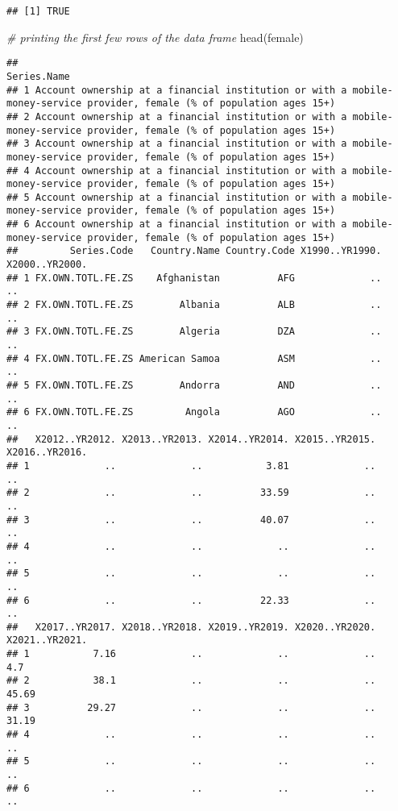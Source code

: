 \documentclass[
]{article}
\newenvironment{Shaded}{\begin{snugshade}}{\end{snugshade}}
\newcommand{\CommentTok}[1]{\textcolor[rgb]{0.56,0.35,0.01}{\textit{#1}}}
\newcommand{\FunctionTok}[1]{\textcolor[rgb]{0.00,0.00,0.00}{#1}}
\newcommand{\NormalTok}[1]{#1}
\begin{document}
\begin{verbatim}
## [1] TRUE
\end{verbatim}

\begin{Shaded}
\begin{Highlighting}[]
\CommentTok{\# printing the first few rows of the data frame}
\FunctionTok{head}\NormalTok{(female)}
\end{Highlighting}
\end{Shaded}

\begin{verbatim}
##                                                                                                               Series.Name
## 1 Account ownership at a financial institution or with a mobile-money-service provider, female (% of population ages 15+)
## 2 Account ownership at a financial institution or with a mobile-money-service provider, female (% of population ages 15+)
## 3 Account ownership at a financial institution or with a mobile-money-service provider, female (% of population ages 15+)
## 4 Account ownership at a financial institution or with a mobile-money-service provider, female (% of population ages 15+)
## 5 Account ownership at a financial institution or with a mobile-money-service provider, female (% of population ages 15+)
## 6 Account ownership at a financial institution or with a mobile-money-service provider, female (% of population ages 15+)
##         Series.Code   Country.Name Country.Code X1990..YR1990. X2000..YR2000.
## 1 FX.OWN.TOTL.FE.ZS    Afghanistan          AFG             ..             ..
## 2 FX.OWN.TOTL.FE.ZS        Albania          ALB             ..             ..
## 3 FX.OWN.TOTL.FE.ZS        Algeria          DZA             ..             ..
## 4 FX.OWN.TOTL.FE.ZS American Samoa          ASM             ..             ..
## 5 FX.OWN.TOTL.FE.ZS        Andorra          AND             ..             ..
## 6 FX.OWN.TOTL.FE.ZS         Angola          AGO             ..             ..
##   X2012..YR2012. X2013..YR2013. X2014..YR2014. X2015..YR2015. X2016..YR2016.
## 1             ..             ..           3.81             ..             ..
## 2             ..             ..          33.59             ..             ..
## 3             ..             ..          40.07             ..             ..
## 4             ..             ..             ..             ..             ..
## 5             ..             ..             ..             ..             ..
## 6             ..             ..          22.33             ..             ..
##   X2017..YR2017. X2018..YR2018. X2019..YR2019. X2020..YR2020. X2021..YR2021.
## 1           7.16             ..             ..             ..            4.7
## 2           38.1             ..             ..             ..          45.69
## 3          29.27             ..             ..             ..          31.19
## 4             ..             ..             ..             ..             ..
## 5             ..             ..             ..             ..             ..
## 6             ..             ..             ..             ..             ..
\end{verbatim}
\end{document}
